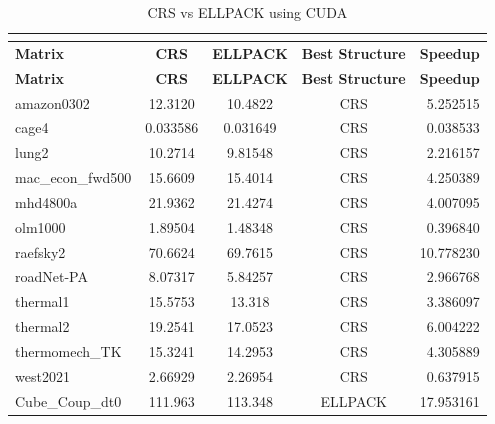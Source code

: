 \documentclass[12pt,oneside]{book} %
\begin{document}
\newpage
\begin{longtable}{lcccr}
    \caption{CRS vs ELLPACK using CUDA}                                                              \\
    \label{tab:crsvsellpackcuda}                                                                     \\
    \toprule
    \textbf{Matrix}   & \textbf{CRS} & \textbf{ELLPACK} & \textbf{Best Structure} & \textbf{Speedup} \\
    \midrule
    \endfirsthead
    \toprule
    \textbf{Matrix}   & \textbf{CRS} & \textbf{ELLPACK} & \textbf{Best Structure} & \textbf{Speedup} \\
    \midrule
    \endhead
    \bottomrule
    \endfoot
    amazon0302        & 12.3120      & 10.4822          & CRS                     & 5.252515         \\
    cage4             & 0.033586     & 0.031649         & CRS                     & 0.038533         \\
    lung2             & 10.2714      & 9.81548          & CRS                     & 2.216157         \\
    mac\_econ\_fwd500 & 15.6609      & 15.4014          & CRS                     & 4.250389         \\
    mhd4800a          & 21.9362      & 21.4274          & CRS                     & 4.007095         \\
    olm1000           & 1.89504      & 1.48348          & CRS                     & 0.396840         \\
    raefsky2          & 70.6624      & 69.7615          & CRS                     & 10.778230        \\
    roadNet-PA        & 8.07317      & 5.84257          & CRS                     & 2.966768         \\
    thermal1          & 15.5753      & 13.318           & CRS                     & 3.386097         \\
    thermal2          & 19.2541      & 17.0523          & CRS                     & 6.004222         \\
    thermomech\_TK    & 15.3241      & 14.2953          & CRS                     & 4.305889         \\
    west2021          & 2.66929      & 2.26954          & CRS                     & 0.637915         \\
    Cube\_Coup\_dt0   & 111.963      & 113.348          & ELLPACK                 & 17.953161        \\

\end{longtable}
\end{document}
